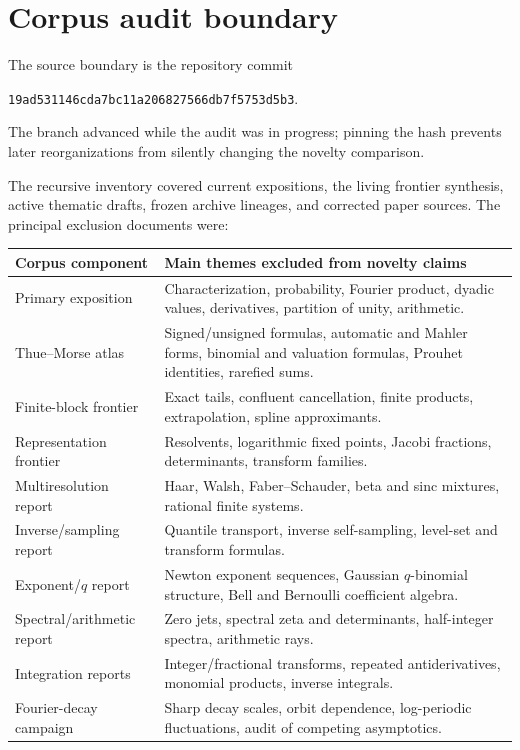 \documentclass[11pt]{article}
\theoremstyle{definition}
\theoremstyle{remark}
\begin{document}
\appendix

\section{Corpus audit boundary}
\label{p5:app:corpus}

The source boundary is the repository commit
\begin{center}
\nolinkurl{19ad531146cda7bc11a206827566db7f5753d5b3}.
\end{center}
The branch advanced while the audit was in progress; pinning the hash prevents
later reorganizations from silently changing the novelty comparison.

The recursive inventory covered current expositions, the living frontier
synthesis, active thematic drafts, frozen archive lineages, and corrected
paper sources.  The principal exclusion documents were:
\begin{center}
\small
\begin{tabularx}{0.96\textwidth}{@{}p{}X@{}}
\toprule
Corpus component & Main themes excluded from novelty claims\\
\midrule
Primary exposition & Characterization, probability, Fourier product, dyadic values, derivatives, partition of unity, arithmetic.\\
Thue--Morse atlas & Signed/unsigned formulas, automatic and Mahler forms, binomial and valuation formulas, Prouhet identities, rarefied sums.\\
Finite-block frontier & Exact tails, confluent cancellation, finite products, extrapolation, spline approximants.\\
Representation frontier & Resolvents, logarithmic fixed points, Jacobi fractions, determinants, transform families.\\
Multiresolution report & Haar, Walsh, Faber--Schauder, beta and sinc mixtures, rational finite systems.\\
Inverse/sampling report & Quantile transport, inverse self-sampling, level-set and transform formulas.\\
Exponent/$q$ report & Newton exponent sequences, Gaussian $q$-binomial structure, Bell and Bernoulli coefficient algebra.\\
Spectral/arithmetic report & Zero jets, spectral zeta and determinants, half-integer spectra, arithmetic rays.\\
Integration reports & Integer/fractional transforms, repeated antiderivatives, monomial products, inverse integrals.\\
Fourier-decay campaign & Sharp decay scales, orbit dependence, log-periodic fluctuations, audit of competing asymptotics.\\
\bottomrule
\end{tabularx}
\end{center}
\end{document}
